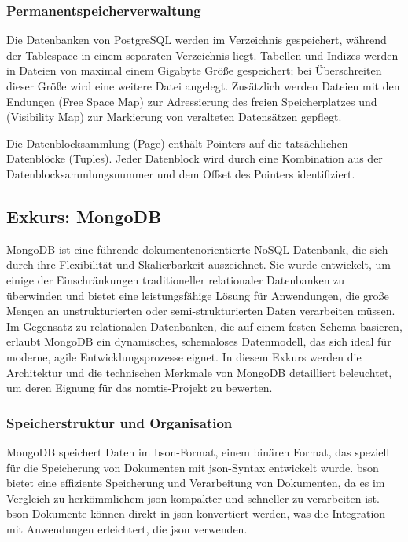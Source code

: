 \subsubsection{Permanentspeicherverwaltung}

Die Datenbanken von PostgreSQL werden im Verzeichnis  gespeichert, während der Tablespace in einem separaten Verzeichnis liegt. Tabellen und Indizes werden in Dateien von maximal einem Gigabyte Größe gespeichert; bei Überschreiten dieser Größe wird eine weitere Datei angelegt. Zusätzlich werden Dateien mit den Endungen  (Free Space Map) zur Adressierung des freien Speicherplatzes und  (Visibility Map) zur Markierung von veralteten Datensätzen gepflegt.

Die Datenblocksammlung (Page) enthält Pointers auf die tatsächlichen Datenblöcke (Tuples). Jeder Datenblock wird durch eine Kombination aus der Datenblocksammlungsnummer und dem Offset des Pointers identifiziert. \cite{Fröhlich2022}

\subsection{Exkurs: MongoDB}
MongoDB ist eine führende dokumentenorientierte NoSQL-Datenbank, die sich durch ihre Flexibilität und Skalierbarkeit auszeichnet. Sie wurde entwickelt, um einige der Einschränkungen traditioneller relationaler Datenbanken zu überwinden und bietet eine leistungsfähige Lösung für Anwendungen, die große Mengen an unstrukturierten oder semi-strukturierten Daten verarbeiten müssen. Im Gegensatz zu relationalen Datenbanken, die auf einem festen Schema basieren, erlaubt MongoDB ein dynamisches, schemaloses Datenmodell, das sich ideal für moderne, agile Entwicklungsprozesse eignet. In diesem Exkurs werden die Architektur und die technischen Merkmale von MongoDB detailliert beleuchtet, um deren Eignung für das \ac{nomtis}-Projekt zu bewerten.

\subsubsection{Speicherstruktur und Organisation}
MongoDB speichert Daten im \ac{bson}-Format, einem binären Format, das speziell für die Speicherung von Dokumenten mit \ac{json}-Syntax entwickelt wurde. \ac{bson} bietet eine effiziente Speicherung und Verarbeitung von Dokumenten, da es im Vergleich zu herkömmlichem \ac{json} kompakter und schneller zu verarbeiten ist. \ac{bson}-Dokumente können direkt in \ac{json} konvertiert werden, was die Integration mit Anwendungen erleichtert, die \ac{json} verwenden.

